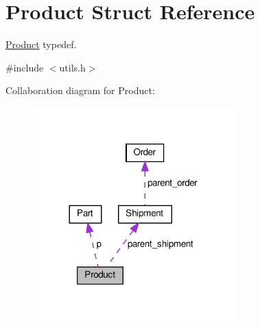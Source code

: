 \hypertarget{structProduct}{}\section{Product Struct Reference}
\label{structProduct}


\hyperlink{structProduct}{Product} typedef.  




{\ttfamily \#include $<$utils.\+h$>$}



Collaboration diagram for Product\+:\nopagebreak
\begin{figure}[H]
\begin{center}
\leavevmode
\includegraphics[width=221pt]{structProduct__coll__graph}
\end{center}
\end{figure}
